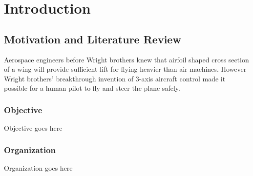 
\chapter{Introduction} %

\label{Chapter1} %



\section{Motivation and Literature Review}

Aerospace engineers before Wright brothers knew that airfoil shaped cross section of a wing will provide sufficient lift for flying heavier than air machines. However Wright brothers' breakthrough invention of 3-axis aircraft control made it possible for a human pilot to fly and steer the plane safely\cite{birthofflightcontrol}. 

\subsection{Objective}

Objective goes here


\subsection{Organization}
Organization goes here

